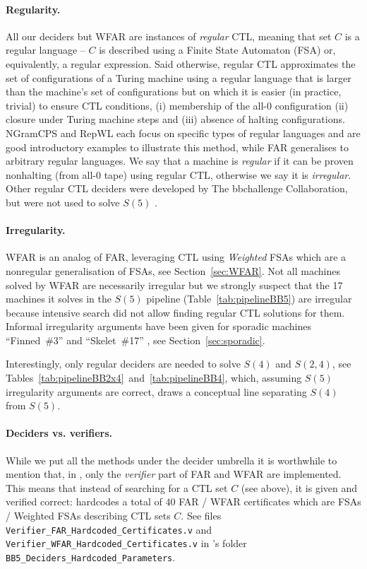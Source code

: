 \paragraph{Regularity.} All our deciders but WFAR are instances of \textit{regular} CTL, meaning that set $C$ is a regular language -- \ie $C$ is described using a Finite State Automaton (FSA) or, equivalently, a regular expression. Said otherwise, regular CTL approximates the set of configurations of a Turing machine using a regular language that is larger than the machine's set of configurations but on which it is easier (in practice, trivial) to ensure CTL conditions, \ie (i) membership of the all-0 configuration (ii) closure under Turing machine steps and (iii) absence of halting configurations. NGramCPS and RepWL each focus on specific types of regular languages and are good introductory examples to illustrate this method, while FAR generalises to arbitrary regular languages. We say that a machine is \textit{regular} if it can be proven nonhalting (from all-0 tape) using regular CTL, otherwise we say it is \textit{irregular}. Other regular CTL deciders were developed by The bbchallenge Collaboration, but were not used to solve $S(5)$ \cite{BruteforceCTL, SymbolicTM, regexy, bbchallenge_part1}.

\vspace{-1ex}
\paragraph{Irregularity.} WFAR is an analog of FAR, leveraging CTL using \textit{Weighted} FSAs which are a nonregular generalisation of FSAs, see Section~\ref{sec:WFAR}. Not all machines solved by WFAR are necessarily irregular but we strongly suspect that the 17 machines it solves in the $S(5)$ pipeline (Table~\ref{tab:pipelineBB5}) are irregular because intensive search did not allow finding regular CTL solutions for them. Informal irregularity arguments have been given for sporadic machines ``Finned~\#3'' and ``Skelet~\#17'' \cite{irregularFinned3, irregularSk17}, see Section~\ref{sec:sporadic}.

Interestingly, only regular deciders are needed to solve $S(4)$ and $S(2,4)$, see Tables~\ref{tab:pipelineBB2x4}~and~\ref{tab:pipelineBB4}, which, assuming $S(5)$ irregularity arguments are correct, draws a conceptual line separating $S(4)$ from $S(5)$.

\vspace{-1ex}
\paragraph{Deciders vs. verifiers.} While we put all the methods under the decider umbrella it is worthwhile to mention that, in \CoqBB, only the \textit{verifier} part of FAR and WFAR are implemented. This means that instead of searching for a CTL set $C$ (see above), it is given and verified correct: \CoqBB hardcodes a total of $40$ FAR /
WFAR certificates which are FSAs / Weighted FSAs describing CTL sets $C$. See files \texttt{Verifier\_FAR\_Hardcoded\_Certificates.v} and \texttt{Verifier\_WFAR\_Hardcoded\_Certificates.v} in \CoqBB's folder \texttt{BB5\_Deciders\_Hardcoded\_Parameters}.


